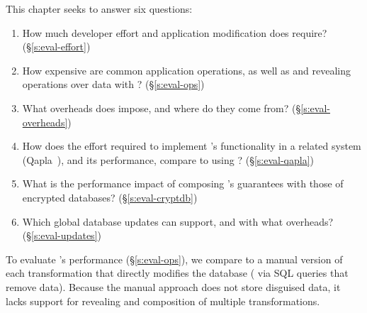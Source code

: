 This chapter seeks to answer six questions:
%
\begin{enumerate}[nosep]
 \item How much developer effort and application modification does \sys require? (\S\ref{s:eval-effort})
%
\item How expensive are common application operations, as well as
  \xxing and revealing operations over \xxed data with \sys? (\S\ref{s:eval-ops})

\item What overheads does \sys impose, and where do they come from?
    (\S\ref{s:eval-overheads})

\item 
    How does the effort required to implement \sys's
    functionality in a related system (Qapla~\cite{qapla}),
    and its performance, compare to using \sys?
    (\S\ref{s:eval-qapla})

\item 
    What is the performance impact of composing \sys's guarantees
    with those of encrypted databases?
        (\S\ref{s:eval-cryptdb})

\item 
    Which global database updates can \sys
        support, and with what overheads? (\S\ref{s:eval-updates})
%
\end{enumerate}

To evaluate \sys's performance (\S\ref{s:eval-ops}), we compare \sys to a manual
version of each \xxing transformation that directly modifies the database (\eg
via SQL queries that remove data). Because the manual approach does not store
disguised data, it lacks support for revealing and
composition of multiple transformations. 

%

%
%
%
%

